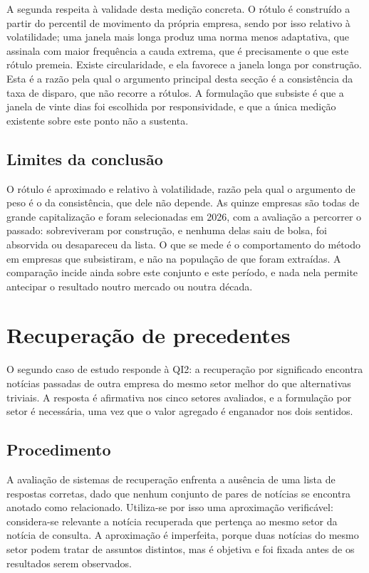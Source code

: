 A segunda respeita à validade desta medição
concreta. O rótulo é construído a partir do percentil de movimento da própria empresa, sendo por isso
relativo à volatilidade; uma janela mais longa produz uma norma menos adaptativa, que assinala com
maior frequência a cauda extrema, que é precisamente o que este rótulo premeia. Existe circularidade,
e ela favorece a janela longa por construção. Esta é a razão pela qual o argumento principal desta
secção é a consistência da taxa de disparo, que não recorre a rótulos. A formulação que subsiste é
que a janela de vinte dias foi escolhida por responsividade, e que a única medição existente sobre
este ponto não a sustenta.

\subsection{Limites da conclusão}

O rótulo é aproximado e relativo à volatilidade, razão pela qual o argumento de peso é o da
consistência, que dele não depende. As quinze empresas são todas de grande capitalização e foram
selecionadas em 2026, com a avaliação a percorrer o passado: sobreviveram por construção, e nenhuma
delas saiu de bolsa, foi absorvida ou desapareceu da lista. O que se mede é o comportamento do
método em empresas que subsistiram, e não na população de que foram extraídas. A comparação incide
ainda sobre este conjunto e este período, e nada nela permite antecipar o resultado noutro mercado
ou noutra década.

\section{Recuperação de precedentes}
\label{sec:av_qi2}

O segundo caso de estudo responde à \gls{QI}2: a recuperação por significado encontra notícias
passadas de outra empresa do mesmo setor melhor do que alternativas triviais. A resposta é
afirmativa nos cinco setores avaliados, e a formulação por setor é necessária, uma vez que o valor
agregado é enganador nos dois sentidos.

\subsection{Procedimento}

A avaliação de sistemas de recuperação enfrenta a ausência de uma lista de respostas corretas, dado
que nenhum conjunto de pares de notícias se encontra anotado como relacionado. Utiliza-se por isso
uma aproximação verificável: considera-se relevante a notícia recuperada que pertença ao mesmo setor
da notícia de consulta. A aproximação é imperfeita, porque duas notícias do mesmo setor podem tratar
de assuntos distintos, mas é objetiva e foi fixada antes de os resultados serem observados.

